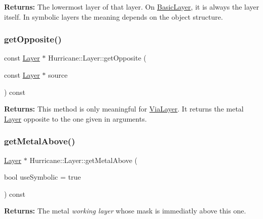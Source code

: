 {\bfseries Returns\+:} The lowermost layer of that layer. On \hyperlink{classHurricane_1_1BasicLayer}{Basic\+Layer}, it is always the layer itself. In symbolic layers the meaning depends on the object structure. \mbox{\label{classHurricane_1_1Layer_a69e76c09a56260169c4f5c145a35a47f}} 
\subsubsection{\texorpdfstring{get\+Opposite()}{getOpposite()}}
{\footnotesize\ttfamily const \hyperlink{classHurricane_1_1Layer}{Layer} $\ast$ Hurricane\+::\+Layer\+::get\+Opposite (\begin{DoxyParamCaption}\item[{const \hyperlink{classHurricane_1_1Layer}{Layer} $\ast$}]{source }\end{DoxyParamCaption}) const\hspace{0.3cm}{\ttfamily [virtual]}}

{\bfseries Returns\+:} This method is only meaningful for \hyperlink{classHurricane_1_1ViaLayer}{Via\+Layer}. It returns the metal \hyperlink{classHurricane_1_1Layer}{Layer} opposite to the one given in arguments. \mbox{\label{classHurricane_1_1Layer_ac32eff2dc51180660fe9b4ce17cae42c}} 
\subsubsection{\texorpdfstring{get\+Metal\+Above()}{getMetalAbove()}}
{\footnotesize\ttfamily \hyperlink{classHurricane_1_1Layer}{Layer} $\ast$ Hurricane\+::\+Layer\+::get\+Metal\+Above (\begin{DoxyParamCaption}\item[{bool}]{use\+Symbolic = {\ttfamily true} }\end{DoxyParamCaption}) const}

{\bfseries Returns\+:} The metal {\itshape working layer} whose mask is immediatly above this one. \mbox{\label{classHurricane_1_1Layer_a4bc8358f67c1a1a9b2581e4b3732108c}} 
